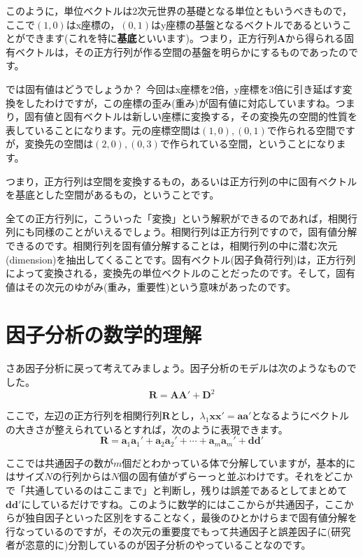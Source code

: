 \documentclass{ltjsbook}
\begin{document}
このように，単位ベクトルは2次元世界の基礎となる単位ともいうべきもので，ここで$(1,0)$はx座標の，$(0,1)$はy座標の基盤となるベクトルであるということができます(これを特に\textbf{基底}といいます)。つまり，正方行列$\bm{A}$から得られる固有ベクトルは，その正方行列が作る空間の基盤を明らかにするものであったのです。

では固有値はどうでしょうか？ 今回はx座標を2倍，y座標を3倍に引き延ばす変換をしたわけですが，この座標の歪み(重み)が固有値に対応していますね。つまり，固有値と固有ベクトルは新しい座標に変換する，その変換先の空間的性質を表していることになります。元の座標空間は$(1,0),(0,1)$で作られる空間ですが，変換先の空間は$(2,0),(0,3)$で作られている空間，ということになります。

つまり，正方行列は空間を変換するもの，あるいは正方行列の中に固有ベクトルを基底とした空間があるもの，ということです。

全ての正方行列に，こういった「変換」という解釈ができるのであれば，相関行列にも同様のことがいえるでしょう。相関行列は正方行列ですので，固有値分解できるのです。相関行列を固有値分解することは，相関行列の中に潜む次元(dimension)を抽出してくることです。固有ベクトル(因子負荷行列)は，正方行列によって変換される，変換先の単位ベクトルのことだったのです。そして，固有値はその次元のゆがみ(重み，重要性)という意味があったのです。

\section{因子分析の数学的理解}
さあ因子分析に戻って考えてみましょう。因子分析のモデルは次のようなものでした。
\begin{equation}
    \bm{R} = \bm{A} \bm{A} ' + \bm{D}^2
\end{equation}

ここで，左辺の正方行列を相関行列$\bm{R}$とし，$\lambda_1 \bm{xx'} = \bm{aa'}$となるようにベクトルの大きさが整えられているとすれば，次のように表現できます。
\begin{equation}
\bm{R}=\bm{a}_1\bm{a}_1'+\bm{a}_2\bm{a}_2'+\cdots +\bm{a}_m\bm{a}_m'+\bm{d} \bm{d}'
\end{equation}

ここでは共通因子の数が$m$個だとわかっている体で分解していますが，基本的にはサイズ$N$の行列からは$N$個の固有値がずらーっと並ぶわけです。それをどこかで「共通しているのはここまで」と判断し，残りは誤差であるとしてまとめて$\bm{dd'}$にしているだけですね。このように数学的にはここからが共通因子，ここからが独自因子といった区別をすることなく，最後のひとかけらまで固有値分解を行なっているのですが，その次元の重要度でもって共通因子と誤差因子に(研究者が恣意的に)分割しているのが因子分析のやっていることなのです。
\end{document}
